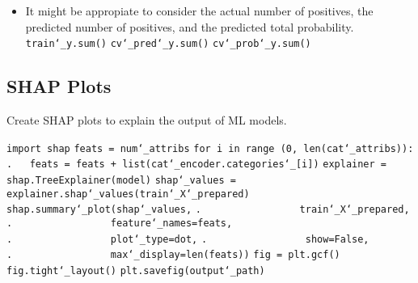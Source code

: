 \begin{itemize}
\item
It might be appropiate to consider
the actual number of positives,
the predicted number of positives,
and the predicted total probability.\newline
\texttt{train\char`_y.sum()}\newline
\texttt{cv\char`_pred\char`_y.sum()}\newline
\texttt{cv\char`_prob\char`_y.sum()}\newline

\end{itemize}

\subsection{SHAP Plots}

Create SHAP plots to explain the output of ML models.

\texttt{import shap}\newline
\newline
\texttt{feats = num\char`_attribs}\newline
\texttt{for i in range (0, len(cat\char`_attribs)):}\newline
\texttt{.~~~feats = feats + list(cat\char`_encoder.categories\char`_[i])}\newline
\newline
\texttt{explainer = shap.TreeExplainer(model)}\newline
\texttt{shap\char`_values = explainer.shap\char`_values(train\char`_X\char`_prepared)}\newline
\newline
\texttt{shap.summary\char`_plot(shap\char`_values,}\newline
\texttt{.~~~~~~~~~~~~~~~~~train\char`_X\char`_prepared,}\newline
\texttt{.~~~~~~~~~~~~~~~~~feature\char`_names=feats,}\newline
\texttt{.~~~~~~~~~~~~~~~~~plot\char`_type=\textquotesingle dot\textquotesingle,}\newline
\texttt{.~~~~~~~~~~~~~~~~~show=False,}\newline
\texttt{.~~~~~~~~~~~~~~~~~max\char`_display=len(feats))}\newline
\texttt{fig = plt.gcf()}\newline
\texttt{fig.tight\char`_layout()}\newline
\texttt{plt.savefig(output\char`_path)}\newline

